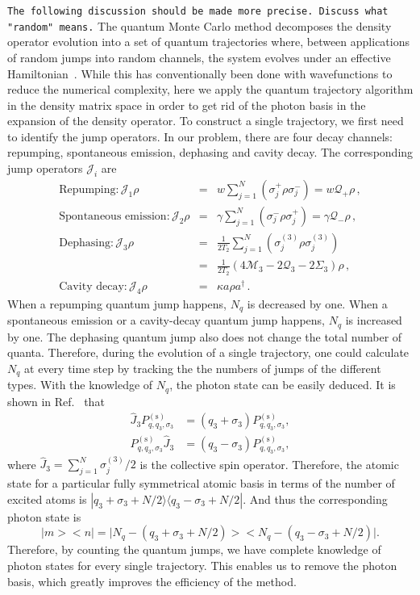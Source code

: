 \documentclass[aps,prl,twocolumn,
superscriptaddress,groupedaddress]{revtex4}
\newcommand{\dmcomment}[1]{{\tt #1}}
\begin{document}
\dmcomment{The following discussion should be made more precise.
Discuss what "random" means.}
The quantum Monte Carlo method decomposes the density operator evolution
into a set of quantum trajectories where, between applications of random
jumps into random channels, the system evolves under an effective
Hamiltonian~\cite{Dalibard92,Dum92,Knight98}. While this has
conventionally been done with wavefunctions to reduce the numerical
complexity, here we apply the quantum trajectory algorithm in the
density matrix space in order to get rid of the photon basis in the
expansion of the density operator. To construct a single trajectory, we
first need to identify the jump operators. In our problem, there are
four decay channels: repumping, spontaneous emission, dephasing and
cavity decay. The corresponding jump operators $\mathcal{J}_i$ are
\begin{eqnarray}
\mathrm{Repumping:} \mathcal{J}_1\rho&=&
w\sum_{j=1}^N(\sigma_j^+\rho\sigma_j^-)=w\mathcal{Q}_{+}\rho\,,
\nonumber\\
\mathrm{Spontaneous\,\,emission:}  \mathcal{J}_2\rho&=&
\gamma\sum_{j=1}^N(\sigma_j^-\rho\sigma_j^+)=
\gamma \mathcal{Q}_{-}\rho\,,\nonumber\\
\mathrm{Dephasing:} \mathcal{J}_3\rho&=&
\frac{1}{2T_2}\sum_{j=1}^N(\sigma_j^{(3)}\rho\sigma_j^{(3)})
\nonumber\\
&=&\frac{1}{2T_2}(4\mathcal{M}_3-2  \mathcal{Q}_3-2\Sigma_3)\rho\,,
\nonumber\\
\mathrm{Cavity\,\,decay:}  \mathcal{J}_4\rho&=&\kappa a\rho a^{\dagger}\,.
\label{jumpo}
\end{eqnarray}
When a repumping quantum jump happens, $N_q$ is decreased by one. When a
spontaneous emission or a cavity-decay quantum jump happens, $N_q$ is
increased by one. The dephasing quantum jump also does not change the
total number of quanta. Therefore, during the evolution of a single
trajectory, one could calculate $N_q$ at every time step by tracking the
the numbers of jumps of the different types. With the knowledge of
$N_q$, the photon state can be easily deduced. It is shown in
Ref.~\cite{Holland13} that
\begin{equation}
\begin{split}
  \hat{J}_3P_{q,q_3,\sigma_3}^{(\mathrm{s})}&=
  (q_3+\sigma_3)P_{q,q_3,\sigma_3}^{(\mathrm{s})},\\
  P_{q,q_3,\sigma_3}^{(\mathrm{s})}\hat{J}_3&=
  (q_3-\sigma_3)P_{q,q_3,\sigma_3}^{(\mathrm{s})},
\end{split}
\end{equation}
where $\hat{J}_3=\sum_{j=1}^N\sigma_j^{(3)}/2$ is the collective spin
operator. Therefore, the atomic state for a particular fully symmetrical
atomic basis in terms of the number of excited atoms is
$|q_3+\sigma_3+N/2\rangle\langle q_3-\sigma_3+N/2|$. And thus the
corresponding photon state is
\begin{equation}
\bigl|m\bigr>\bigl<n\bigr|=
\bigl|N_q-(q_3+\sigma_3+N/2)\bigr>
\bigl<N_q-(q_3-\sigma_3+N/2)\bigr|.
\end{equation}
Therefore, by counting the quantum jumps, we have complete knowledge of
photon states for every single trajectory. This enables us to remove the
photon basis, which greatly improves the efficiency of the method.
\end{document}
